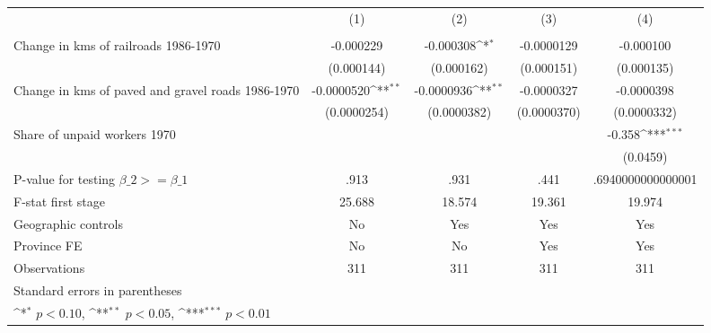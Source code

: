 {
\def\sym#1{\ifmmode^{#1}\else\(^{#1}\)\fi}
\begin{tabular}{l*{4}{c}}
\hline\hline
                &\multicolumn{1}{c}{(1)}&\multicolumn{1}{c}{(2)}&\multicolumn{1}{c}{(3)}&\multicolumn{1}{c}{(4)}\\
                &\multicolumn{1}{c}{}&\multicolumn{1}{c}{}&\multicolumn{1}{c}{}&\multicolumn{1}{c}{}\\
\hline
Change in kms of railroads 1986-1970&-0.000229         &-0.000308\sym{*}  &-0.0000129         &-0.000100         \\
                &(0.000144)         &(0.000162)         &(0.000151)         &(0.000135)         \\
[1em]
Change in kms of paved and gravel roads 1986-1970&-0.0000520\sym{**} &-0.0000936\sym{**} &-0.0000327         &-0.0000398         \\
                &(0.0000254)         &(0.0000382)         &(0.0000370)         &(0.0000332)         \\
[1em]
Share of unpaid workers 1970&                  &                  &                  &   -0.358\sym{***}\\
                &                  &                  &                  & (0.0459)         \\
\hline
P-value for testing $\beta\_{2} >= \beta\_{1}$&     .913         &     .931         &     .441         &.6940000000000001         \\
F-stat first stage&   25.688         &   18.574         &   19.361         &   19.974         \\
Geographic controls&       No         &      Yes         &      Yes         &      Yes         \\
Province FE     &       No         &       No         &      Yes         &      Yes         \\
Observations    &      311         &      311         &      311         &      311         \\
\hline\hline
\multicolumn{5}{l}{\footnotesize Standard errors in parentheses}\\
\multicolumn{5}{l}{\footnotesize \sym{*} \(p<0.10\), \sym{**} \(p<0.05\), \sym{***} \(p<0.01\)}\\
\end{tabular}
}
